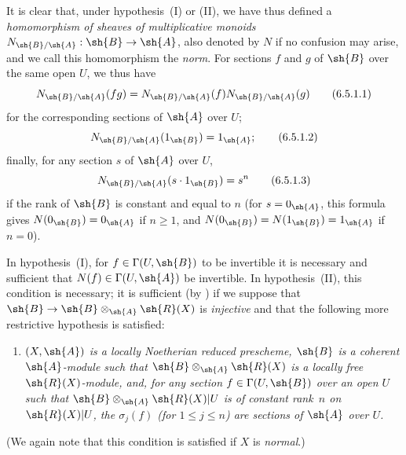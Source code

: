 \begin{env}[6.5.1]
It is clear that, under hypothesis~(I) or (II), we have thus defined a \emph{homomorphism of sheaves of multiplicative monoids} $N_{\sh{B}/\sh{A}}:\sh{B}\to\sh{A}$, also denoted by $N$ if no confusion may arise, and we call this homomorphism the \emph{norm}.
For sections $f$ and $g$ of $\sh{B}$ over the same open $U$, we thus have
\[
\label{II.6.5.1.1}
  N_{\sh{B}/\sh{A}}(fg) = N_{\sh{B}/\sh{A}}(f)N_{\sh{B}/\sh{A}}(g)
\tag{6.5.1.1}
\]
for the corresponding sections of $\sh{A}$ over $U$;
\[
\label{II.6.5.1.2}
  N_{\sh{B}/\sh{A}}(1_{\sh{B}}) = 1_{\sh{A}};
\tag{6.5.1.2}
\]
finally, for any section $s$ of $\sh{A}$ over $U$,
\[
\label{II.6.5.1.3}
  N_{\sh{B}/\sh{A}}(s\cdot1_{\sh{B}}) = s^n
\tag{6.5.1.3}
\]
if the rank of $\sh{B}$ is constant and equal to $n$ (for $s=0_{\sh{A}}$, this formula gives $N(0_{\sh{B}})=0_{\sh{A}}$ if $n\geq1$, and $N(0_{\sh{B}})=N(1_{\sh{B}})=1_{\sh{A}}$ if $n=0$).

In hypothesis~(I), for $f\in\Gamma(U,\sh{B})$ to be invertible it is necessary and sufficient that $N(f)\in\Gamma(U,\sh{A})$ be invertible.
In hypothesis~(II), this condition is necessary;
it is sufficient (by ) if we suppose that $\sh{B}\to\sh{B}\otimes_{\sh{A}}\sh{R}(X)$ is \emph{injective} and that the following more restrictive hypothesis is satisfied:
\begin{enumerate}
  \item[(II~\emph{bis})] \emph{$(X,\sh{A})$ is a locally Noetherian reduced prescheme, $\sh{B}$ is a coherent $\sh{A}$-module such that $\sh{B}\otimes_{\sh{A}}\sh{R}(X)$ is a locally free $\sh{R}(X)$-module, and, for any section $f\in\Gamma(U,\sh{B})$ over an open $U$ such that $\sh{B}\otimes_{\sh{A}}\sh{R}(X)|U$ is of constant rank~$n$ on $\sh{R}(X)|U$, the $\sigma_j(f)$ (for $1\leq j\leq n$) are sections of $\sh{A}$ over $U$.}
\end{enumerate}

(We again note that this condition is satisfied if $X$ is \emph{normal}.)
\end{env}

